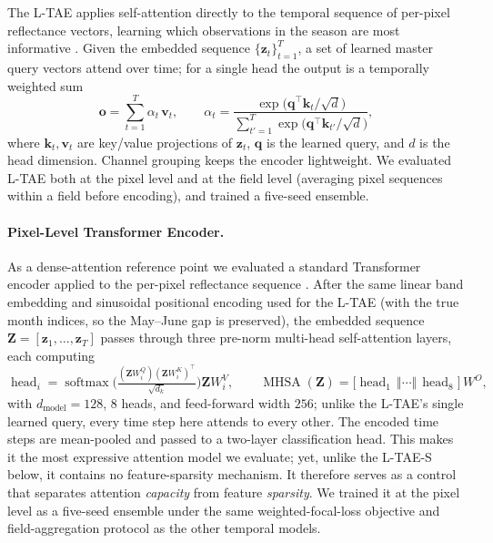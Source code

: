 \documentclass[pdflatex,sn-mathphys]{sn-jnl} %
\begin{document}
The L-TAE applies self-attention directly to the temporal sequence of per-pixel
reflectance vectors, learning which observations in the season are most informative
\cite{ltae2020}. Given the embedded sequence $\{\mathbf{z}_t\}_{t=1}^{T}$, a set of
learned master query vectors attend over time; for a single head the output is a
temporally weighted sum
\[
    \mathbf{o} = \sum_{t=1}^{T}\alpha_t\,\mathbf{v}_t,
    \qquad
    \alpha_t = \frac{\exp\!\big(\mathbf{q}^\top\mathbf{k}_t/\sqrt{d}\big)}
                    {\sum_{t'=1}^{T}\exp\!\big(\mathbf{q}^\top\mathbf{k}_{t'}/\sqrt{d}\big)},
\]
where $\mathbf{k}_t,\mathbf{v}_t$ are key/value projections of $\mathbf{z}_t$,
$\mathbf{q}$ is the learned query, and $d$ is the head dimension. Channel grouping
keeps the encoder lightweight. We evaluated L-TAE both at the pixel level and at the
field level (averaging pixel sequences within a field before encoding), and trained a
five-seed ensemble.

\paragraph{Pixel-Level Transformer Encoder.}

As a dense-attention reference point we evaluated a standard Transformer encoder applied
to the per-pixel reflectance sequence \cite{vaswani2017, russwurm2020}. After the same
linear band embedding and sinusoidal positional encoding used for the L-TAE (with the
true month indices, so the May--June gap is preserved), the embedded sequence
$\mathbf{Z}=[\mathbf{z}_1,\dots,\mathbf{z}_T]$ passes through three pre-norm multi-head
self-attention layers, each computing
\[
  \operatorname{head}_i=\operatorname{softmax}\!\Big(
    \tfrac{(\mathbf{Z}W_i^{Q})(\mathbf{Z}W_i^{K})^{\top}}{\sqrt{d_k}}\Big)\mathbf{Z}W_i^{V},
  \qquad
  \operatorname{MHSA}(\mathbf{Z})=\big[\operatorname{head}_1\,\Vert\cdots\Vert\,
    \operatorname{head}_{8}\big]\,W^{O},
\]
with $d_{\text{model}}=128$, $8$ heads, and feed-forward width $256$; unlike the L-TAE's
single learned query, every time step here attends to every other. The encoded time steps
are mean-pooled and passed to a two-layer classification head. This makes it the most expressive attention
model we evaluate; yet, unlike the L-TAE-S below, it contains no feature-sparsity
mechanism. It therefore serves as a control that
separates attention \emph{capacity} from feature \emph{sparsity}. We trained it at the
pixel level as a five-seed ensemble under the same weighted-focal-loss objective and
field-aggregation protocol as the other temporal models.
\end{document}
